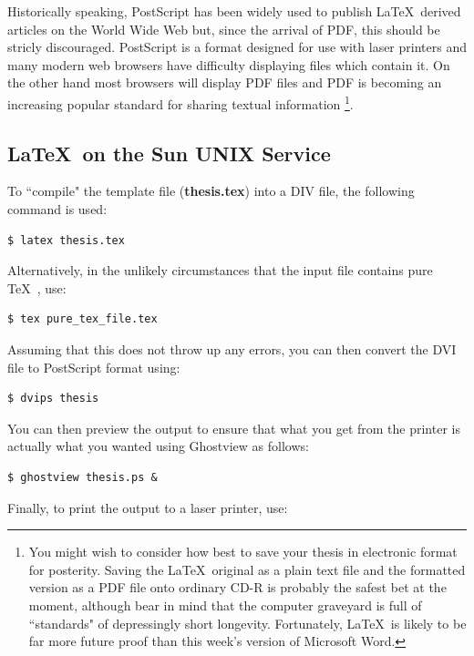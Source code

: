 \documentclass[11pt,oneside]{book}
\begin{document}
Historically speaking, PostScript has been widely used to 
publish \LaTeX \ derived articles
on the World Wide Web but, since the arrival of PDF, this should be
stricly discouraged. PostScript is a format designed for use with
laser printers and many modern web browsers have difficulty displaying
files which contain it. On the other hand most browsers will display
PDF files and PDF is becoming an increasing popular standard for sharing
textual information
\footnote{
You might wish to consider how best to save your thesis in electronic format
for posterity. Saving the \LaTeX \ original as a plain text file and 
the formatted version as a PDF file
onto 
ordinary CD-R is probably the safest bet at the moment, although bear in mind 
that the computer graveyard is full of ``standards" of depressingly short longevity.
Fortunately, \LaTeX \ is likely to be far more future proof than this week's version
of Microsoft Word.
}.

\subsection{\LaTeX \ on the Sun UNIX Service}

To ``compile" the template file ({\bf thesis.tex}) into a DIV file, the
following command is used:

\begin{verbatim}
$ latex thesis.tex   
\end{verbatim}

Alternatively, in the unlikely circumstances that the input file contains pure
\TeX \ , use: 

\begin{verbatim}
$ tex pure_tex_file.tex   
\end{verbatim}

Assuming that this does not throw up any errors, you can then convert the
DVI file to PostScript format using:

\begin{verbatim}
$ dvips thesis  
\end{verbatim}

You can then preview the output to ensure that what you get from the
printer is actually what you wanted using Ghostview as 
follows:

\begin{verbatim}
$ ghostview thesis.ps &
\end{verbatim}


Finally, to print the output to a laser printer, use:
\end{document}
